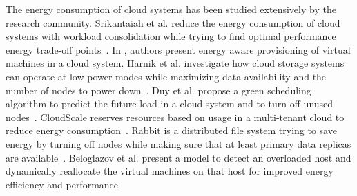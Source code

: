 The energy consumption of cloud systems has been studied extensively by the research
community. Srikantaiah et al. reduce the energy consumption of cloud systems
with workload consolidation while trying to find optimal performance
energy trade-off points~\cite{Srikantaiah:2008:EAC:1855610.1855620}.
In \cite{Kim:2009:PPC:1657120.1657121}, authors present energy aware provisioning
of virtual machines in a cloud system. Harnik et al. investigate how cloud storage
systems can operate at low-power modes while maximizing data availability and the
number of nodes to power down~\cite{Harnik:2009:LPM:1586640.1587438}. Duy et al.
propose a green scheduling algorithm to predict the future load in a cloud
system and to turn off unused nodes~\cite{5470908}. CloudScale reserves resources
based on usage in a multi-tenant cloud to reduce energy consumption~\cite{Shen:2011:CER:2038916.2038921}.
Rabbit is a distributed file system trying to save energy by turning off nodes while
making sure that at least primary data replicas are available~\cite{Amur:2010:RFP:1807128.1807164}.
Beloglazov et al. present a model to detect an overloaded host and dynamically reallocate
the virtual machines on that host for improved energy efficiency and
performance~\cite{Beloglazov:2013:MOH:2498743.2498939}


